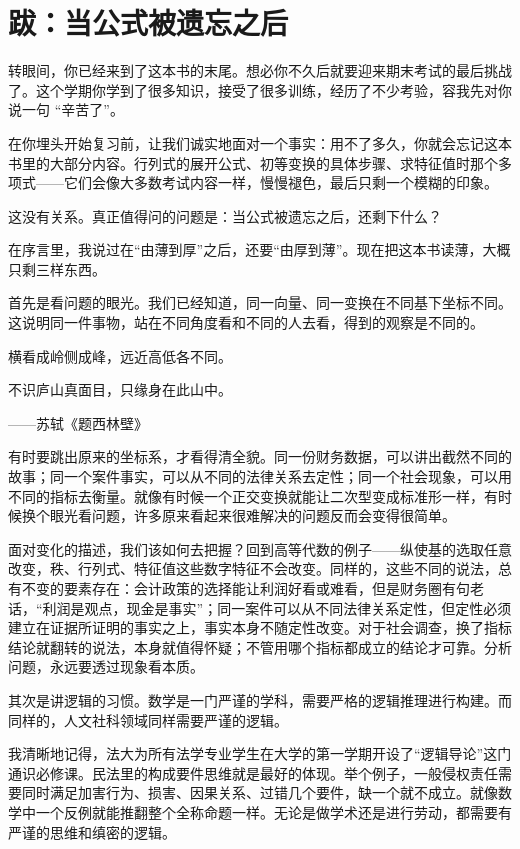 \documentclass[lang=cn,10.5pt,scheme=chinese,toc=twocol,section,chinesefont=nofont,
twoside,citestyle=gb7714-2015,bibstyle=gb7714-2015]{elegantbook}
\newcommand*{\kaishu}{\CJKfamily{zhkai}}
\newcommand*{\fangsong}{\CJKfamily{zhfs}}
\DeclareRobustCommand{\textbf}[1]{{\lnsemiboldlatin\lnsemiboldcjk #1}}
\numberwithin{equation}{section}   %
\begin{document}
\chapter*{跋：当公式被遗忘之后}
{\fangsong
  转眼间，你已经来到了这本书的末尾。想必你不久后就要迎来期末考试的最后挑战了。这个学期你学到了很多知识，接受了很多训练，经历了不少考验，容我先对你说一句 “辛苦了”。

  在你埋头开始复习前，让我们诚实地面对一个事实：用不了多久，你就会忘记这本书里的大部分内容。行列式的展开公式、初等变换的具体步骤、求特征值时那个多项式——它们会像大多数考试内容一样，慢慢褪色，最后只剩一个模糊的印象。

  这没有关系。真正值得问的问题是：\textbf{当公式被遗忘之后，还剩下什么？}

  在序言里，我说过在“由薄到厚”之后，还要“由厚到薄”。现在把这本书读薄，大概只剩三样东西。

  \textbf{首先是看问题的眼光。}我们已经知道，同一向量、同一变换在不同基下坐标不同。这说明同一件事物，站在不同角度看和不同的人去看，得到的观察是不同的。
  \begin{tcolorbox}[epigraph]{\kaishu
      横看成岭侧成峰，远近高低各不同。

      不识庐山真面目，只缘身在此山中。}

    \hfill——苏轼《题西林壁》
  \end{tcolorbox}

  有时要跳出原来的坐标系，才看得清全貌。同一份财务数据，可以讲出截然不同的故事；同一个案件事实，可以从不同的法律关系去定性；同一个社会现象，可以用不同的指标去衡量。就像有时候一个正交变换就能让二次型变成标准形一样，有时候换个眼光看问题，许多原来看起来很难解决的问题反而会变得很简单。

  面对变化的描述，我们该如何去把握？回到高等代数的例子——纵使基的选取任意改变，秩、行列式、特征值这些数字特征不会改变。同样的，这些不同的说法，总有不变的要素存在：会计政策的选择能让利润好看或难看，但是财务圈有句老话，“利润是观点，现金是事实”；同一案件可以从不同法律关系定性，但定性必须建立在证据所证明的事实之上，事实本身不随定性改变。对于社会调查，换了指标结论就翻转的说法，本身就值得怀疑；不管用哪个指标都成立的结论才可靠。分析问题，永远要透过现象看本质。

  \textbf{其次是讲逻辑的习惯。}数学是一门严谨的学科，需要严格的逻辑推理进行构建。而同样的，人文社科领域同样需要严谨的逻辑。

  我清晰地记得，法大为所有法学专业学生在大学的第一学期开设了“逻辑导论”这门通识必修课。民法里的构成要件思维就是最好的体现。举个例子，一般侵权责任需要同时满足加害行为、损害、因果关系、过错几个要件，缺一个就不成立。就像数学中一个反例就能推翻整个全称命题一样。无论是做学术还是进行劳动，都需要有严谨的思维和缜密的逻辑。

}
\end{document}
